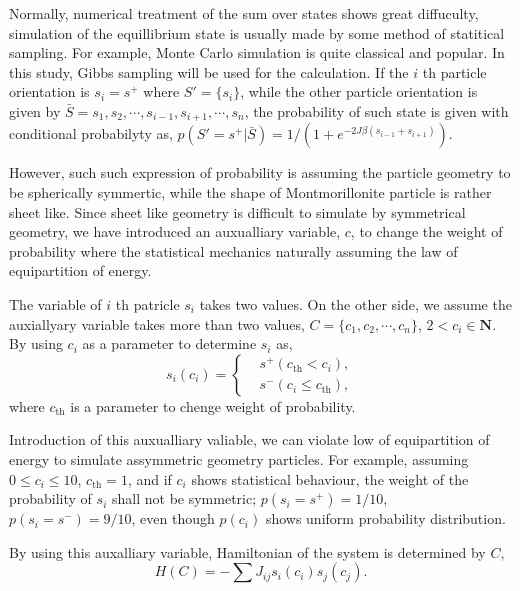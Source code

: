 \documentclass{article}
\begin{document}
Normally, numerical treatment of the sum over states shows great diffuculty, simulation of the equillibrium state is usually made by 
some method of statitical sampling. For example, Monte Carlo simulation is quite classical and popular. 
In this study, Gibbs sampling will be used for the calculation.
If the $i$ th particle orientation is $s_i = s^+$ where $S' = \{s_i\}$, while the other particle orientation is given by
 $\bar{S} = {s_1, s_2, \cdots, s_{i-1}, s_{i+1}, \cdots, s_n}$, the probability of such state is given with conditional probabilyty as,
$p(S'=s^+|\bar{S}) = 1 / (1 + e^{-2 J\beta (s_{i-1} + s_{i+1})})$\cite{Imada_Miyashita_stats_mech}. 

However, such such expression of probability is assuming the particle geometry to be spherically symmertic, 
while the shape of Montmorillonite particle is rather sheet like. 
Since sheet like geometry is difficult to simulate by symmetrical geometry, we have introduced an auxualliary variable, $c$, to 
change the weight of probability where the statistical mechanics naturally assuming the law of equipartition of energy.

The variable of $i$ th patricle $s_i$ takes two values. On the other side, we assume the auxiallyary variable takes more than two values, 
$C = \{c_1, c_2, \cdots, c_n\}$, $2 < c_i \in \mathbf{N}$. By using $c_i$ as a parameter to determine $s_i$ as,
\begin{equation}
 s_i (c_i) = \left\{
  \begin{aligned}
   & s^+  (c_{\text{th}} < c_i), \\
   & s^-  (c_i \leq c_{\text{th}}), 
  \end{aligned}
       \right.
\end{equation}
where $c_{\text{th}}$ is a parameter to chenge weight of probability.

Introduction of this auxualliary valiable, we can violate low of equipartition of energy to simulate assymmetric geometry particles.
For example, assuming $0 \leq c_i \leq 10$, $c_{\text{th}} = 1$, and if $c_i$ shows statistical behaviour, 
the weight of the probability of $s_i$ shall not be symmetric; $p (s_i = s^+) = 1/10$, $p (s_i = s^-) = 9/10$, even though $p (c_i)$ shows uniform probability distribution.

By using this auxalliary variable, Hamiltonian of the system is determined by $C$,
\begin{equation}
 H (C) = - \sum J_{ij} s_i(c_i)s_j(c_j).
\end{equation}
\end{document}
